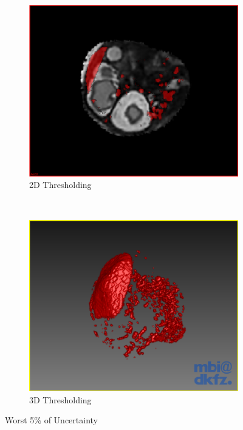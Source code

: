 \begin{figure}[H]
  \centering
  \begin{subfigure}[b]{0.5\textwidth}
    \includegraphics[width=\textwidth]{images/thresholding/thresholding_2d.png}
    \caption{2D Thresholding}\label{fig:threshold_2d}
  \end{subfigure}%
  ~ %
  \begin{subfigure}[b]{0.5\textwidth}
    \includegraphics[width=\textwidth]{images/thresholding/thresholding_3d.png}
    \caption{3D Thresholding}\label{fig:threshold_3d}
  \end{subfigure}
  \caption{Worst 5$\%$ of Uncertainty}\label{fig:threshold_settings_result}
\end{figure}

